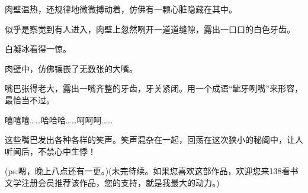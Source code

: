 \begin{this_body}
肉壁温热，还规律地微微搏动着，仿佛有一颗心脏隐藏在其中。

似乎是察觉到有人进入，肉壁上忽然咧开一道道缝隙，露出一口口的白色牙齿。

白凝冰看得一惊。

肉壁中，仿佛镶嵌了无数张的大嘴。

嘴巴张得老大，露出一嘴齐整的牙齿，牙关紧闭。用一个成语“龇牙咧嘴”来形容，最恰当不过。

嘻嘻嘻……哈哈哈……呵呵呵……

这些嘴巴发出各种各样的笑声。笑声混杂在一起，回荡在这次狭小的秘阁中，让人听闻后，不禁心中生悸！

(ps:嗯，晚上八点还有一更。)(未完待续。如果您喜欢这部作品，欢迎您来138看书文学注册会员推荐该作品，您的支持，就是我最大的动力。)

\end{this_body}

